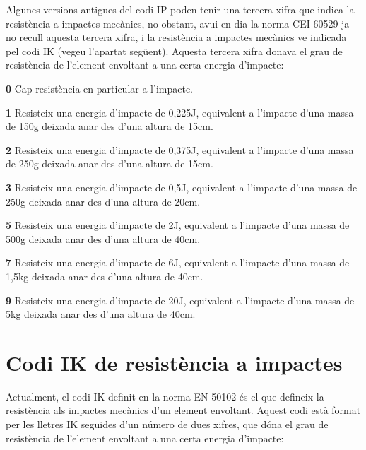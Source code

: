Algunes versions antigues del codi \textsf{IP} poden tenir una tercera xifra que indica la resist\`{e}ncia a impactes mec\`{a}nics, no obstant, avui en dia la norma \textsf{CEI 60529} ja no recull aquesta tercera xifra, i la resist\`{e}ncia a impactes mec\`{a}nics ve indicada pel codi \textsf{IK} (vegeu l'apartat seg\"{u}ent). Aquesta tercera xifra donava el grau de resist\`{e}ncia de l'element envoltant a una certa energia d'impacte:
\begin{list}{}
   {\setlength{\labelwidth}{10mm} \setlength{\leftmargin}{10mm} \setlength{\labelsep}{2mm}}
   \item[\textbf{0}] Cap resist\`{e}ncia en particular a l'impacte.
   \item[\textbf{1}] Resisteix una energia d'impacte de 0,225\unit{J}, equivalent a l'impacte d'una massa de 150\unit{g} deixada anar des d'una altura de 15\unit{cm}.
   \item[\textbf{2}] Resisteix una energia d'impacte de 0,375\unit{J}, equivalent a l'impacte d'una massa de 250\unit{g} deixada anar des d'una altura de 15\unit{cm}.
   \item[\textbf{3}] Resisteix una energia d'impacte de 0,5\unit{J}, equivalent a l'impacte d'una massa de 250\unit{g} deixada anar des d'una altura de 20\unit{cm}.
   \item[\textbf{5}] Resisteix una energia d'impacte de 2\unit{J}, equivalent a l'impacte d'una massa de 500\unit{g} deixada anar des d'una altura de 40\unit{cm}.
   \item[\textbf{7}] Resisteix una energia d'impacte de 6\unit{J}, equivalent a l'impacte d'una massa de 1,5\unit{kg} deixada anar des d'una altura de 40\unit{cm}.
   \item[\textbf{9}]Resisteix una energia d'impacte de 20\unit{J}, equivalent a l'impacte d'una massa de 5\unit{kg} deixada anar des d'una altura de 40\unit{cm}.
\end{list}

\section{Codi IK de resist\`{e}ncia a impactes}   

Actualment, el codi \textsf{IK} definit en la norma \textsf{EN 50102} \'{e}s el que defineix la resist\`{e}ncia  als impactes mec\`{a}nics d'un element  envoltant. Aquest codi est\`{a} format per les lletres \textsf{IK} seguides d'un n\'{u}mero de dues xifres, que d\'{o}na el grau de resist\`{e}ncia de l'element envoltant a una certa energia d'impacte:

